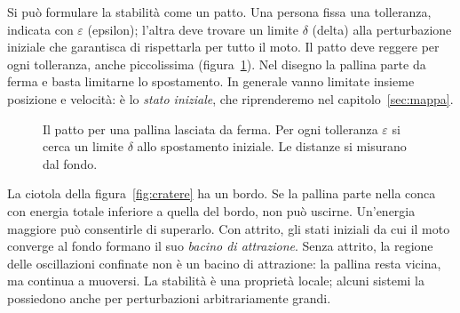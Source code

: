 \documentclass[11pt,a4paper,twoside=false,headinclude,footinclude]{scrartcl}
\begin{document}
Si può formulare la stabilità come un patto. Una persona fissa una tolleranza, indicata con $\varepsilon$ (epsilon); l'altra deve trovare un limite $\delta$ (delta) alla perturbazione iniziale che garantisca di rispettarla per tutto il moto. Il patto deve reggere per ogni tolleranza, anche piccolissima (figura~\ref{fig:patto}). Nel disegno la pallina parte da ferma e basta limitarne lo spostamento. In generale vanno limitate insieme posizione e velocità: è lo \emph{stato iniziale}, che riprenderemo nel capitolo~\ref{sec:mappa}.

\begin{figure}[htbp]
\centering
{}
\caption{Il patto per una pallina lasciata da ferma. Per ogni tolleranza $\varepsilon$ si cerca un limite $\delta$ allo spostamento iniziale. Le distanze si misurano dal fondo.}
\label{fig:patto}
\end{figure}

La ciotola della figura~\ref{fig:cratere} ha un bordo. Se la pallina parte nella conca con energia totale inferiore a quella del bordo, non può uscirne. Un'energia maggiore può consentirle di superarlo. Con attrito, gli stati iniziali da cui il moto converge al fondo formano il suo \emph{bacino di attrazione}. Senza attrito, la regione delle oscillazioni confinate non è un bacino di attrazione: la pallina resta vicina, ma continua a muoversi. La stabilità è una proprietà locale; alcuni sistemi la possiedono anche per perturbazioni arbitrariamente grandi.
\end{document}
